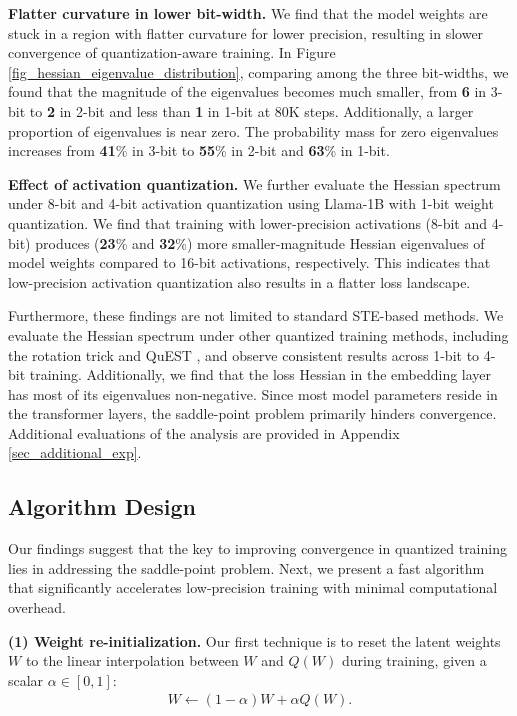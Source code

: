 \documentclass{article}
\theoremstyle{definition}
\begin{document}
\textbf{Flatter curvature in lower bit-width.} We find that the model weights are stuck in a region with flatter curvature for lower precision, resulting in slower convergence of quantization-aware training.  In Figure \ref{fig_hessian_eigenvalue_distribution}, comparing among the three bit-widths, we found that the magnitude of the eigenvalues becomes much smaller, from \textbf{6} in 3-bit to \textbf{2} in 2-bit and less than \textbf{1} in 1-bit at 80K steps. Additionally, a larger proportion of eigenvalues is near zero. The probability mass for zero eigenvalues increases from \textbf{41}\% in 3-bit to \textbf{55}\% in 2-bit and \textbf{63}\% in 1-bit. 

\textbf{Effect of activation quantization.} 
We further evaluate the Hessian spectrum under 8-bit and 4-bit activation quantization using Llama-1B with 1-bit weight quantization. We find that training with lower-precision activations (8-bit and 4-bit) produces (\textbf{23}\% and \textbf{32}\%) more smaller-magnitude Hessian eigenvalues of model weights compared to 16-bit activations, respectively. This indicates that low-precision activation quantization also results in a flatter loss landscape.

Furthermore, these findings are not limited to standard STE-based methods. We evaluate the Hessian spectrum under other quantized training methods, including the rotation trick \cite{fifty2024restructuring} and QuEST \cite{panferov2025quest}, and observe consistent results across 1-bit to 4-bit training.
Additionally, we find that the loss Hessian in the embedding layer has most of its eigenvalues non-negative. 
Since most model parameters reside in the transformer layers, the saddle-point problem primarily hinders convergence. Additional evaluations of the analysis are provided in Appendix \ref{sec_additional_exp}.



\subsection{Algorithm Design}


Our findings suggest that the key to improving convergence in quantized training lies in addressing the saddle-point problem. Next, we present a fast algorithm that significantly accelerates low-precision training with minimal computational overhead. 

\textbf{(1) Weight re-initialization.} Our first technique is to reset the latent weights $W$ to the linear interpolation between $W$ and $Q(W)$ during training, given a scalar $\alpha \in [0, 1]$:
\begin{align}\label{eq_reinitialize}
W \leftarrow (1-\alpha) W + \alpha Q(W).    
\end{align}
\end{document}
